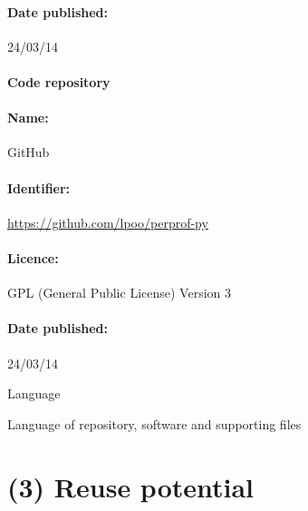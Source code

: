 \documentclass[10pt,a4paper]{article}
\begin{document}
\paragraph{Date published:} 24/03/14

\paragraph{Code repository}


\paragraph{Name:} GitHub

\paragraph{Identifier:} \url{https://github.com/lpoo/perprof-py}

\paragraph{Licence:} GPL (General Public License) Version 3

\paragraph{Date published:} 24/03/14


Language

Language of repository, software and supporting files


\section*{(3) Reuse potential}

\printbibliography
\end{document}
